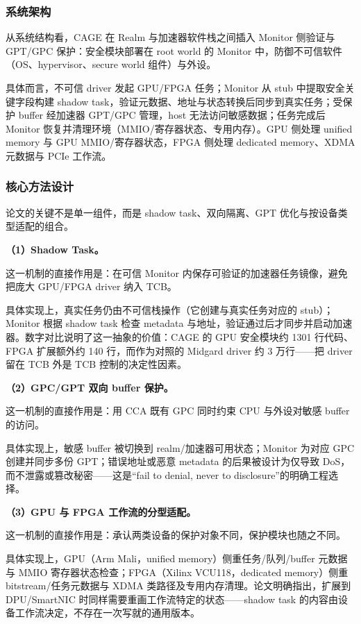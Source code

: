 \documentclass[11pt]{ctexart}
\begin{document}
\subsubsection{系统架构}
从系统结构看，CAGE 在 Realm 与加速器软件栈之间插入 Monitor 侧验证与 GPT/GPC 保护：安全模块部署在 root world 的 Monitor 中，防御不可信软件（OS、hypervisor、secure world 组件）与外设。\par
具体而言，不可信 driver 发起 GPU/FPGA 任务；Monitor 从 stub 中提取安全关键字段构建 shadow task，验证元数据、地址与状态转换后同步到真实任务；受保护 buffer 经加速器 GPT/GPC 管理，host 无法访问敏感数据；任务完成后 Monitor 恢复并清理环境（MMIO/寄存器状态、专用内存）。GPU 侧处理 unified memory 与 GPU MMIO/寄存器状态，FPGA 侧处理 dedicated memory、XDMA 元数据与 PCIe 工作流。\par
\subsubsection{核心方法设计}
论文的关键不是单一组件，而是 shadow task、双向隔离、GPT 优化与按设备类型适配的组合。\par
\noindent\textbf{（1）Shadow Task。}\par
这一机制的直接作用是：在可信 Monitor 内保存可验证的加速器任务镜像，避免把庞大 GPU/FPGA driver 纳入 TCB。\par
具体实现上，真实任务仍由不可信栈操作（它创建与真实任务对应的 stub）；Monitor 根据 shadow task 检查 metadata 与地址，验证通过后才同步并启动加速器。数字对比说明了这一抽象的价值：CAGE 的 GPU 安全模块约 1301 行代码、FPGA 扩展额外约 140 行，而作为对照的 Midgard driver 约 3 万行——把 driver 留在 TCB 外是 TCB 控制的决定性因素。\par
\noindent\textbf{（2）GPC/GPT 双向 buffer 保护。}\par
这一机制的直接作用是：用 CCA 既有 GPC 同时约束 CPU 与外设对敏感 buffer 的访问。\par
具体实现上，敏感 buffer 被切换到 realm/加速器可用状态；Monitor 为对应 GPC 创建并同步多份 GPT；错误地址或恶意 metadata 的后果被设计为仅导致 DoS，而不泄露或篡改秘密——这是“fail to denial, never to disclosure”的明确工程选择。\par
\noindent\textbf{（3）GPU 与 FPGA 工作流的分型适配。}\par
这一机制的直接作用是：承认两类设备的保护对象不同，保护模块也随之不同。\par
具体实现上，GPU（Arm Mali，unified memory）侧重任务/队列/buffer 元数据与 MMIO 寄存器状态检查；FPGA（Xilinx VCU118，dedicated memory）侧重 bitstream/任务元数据与 XDMA 类路径及专用内存清理。论文明确指出，扩展到 DPU/SmartNIC 时同样需要重画工作流特定的状态——shadow task 的内容由设备工作流决定，不存在一次写就的通用版本。\par
\end{document}
